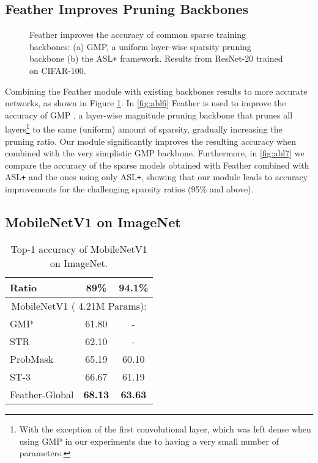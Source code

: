 \documentclass{article}
\begin{document}
\subsection{Feather Improves Pruning Backbones}


\begin{figure}[H]
\begin{center}
\caption{ Feather improves the accuracy of common sparse training backbones: (a) GMP, a uniform layer-wise sparsity pruning backbone (b) the ASL\texttt{+} framework. Results from ResNet-20 trained on CIFAR-100.}
\label{fig:abl67}
\end{center}
\end{figure}

Combining the Feather module with existing backbones results to more accurate networks, as shown in Figure \ref{fig:abl67}. In \ref{fig:abl6} Feather is used to improve the accuracy of GMP \cite{zhu2017prune}, a layer-wise magnitude pruning backbone that prunes all layers\footnote{With the exception of the first convolutional layer, which was left dense when using GMP in our experiments due to having a very small number of parameters.}
to the same (uniform) amount of sparsity, gradually increasing the pruning ratio. Our module significantly improves the resulting accuracy when combined with the very simplistic GMP backbone. Furthermore, in \ref{fig:abl7} we compare the accuracy of the sparse models obtained with Feather combined with ASL\texttt{+} \cite{retsinas2021online} and the ones using only ASL\texttt{+}, showing that our module leads to accuracy improvements for the challenging sparsity ratios (95\% and above).


\subsection{MobileNetV1 on ImageNet}

\begin{table}[H]
\begin{center}
\begin{tabular}{lcc}
\toprule
Ratio & 89\% & 94.1\%   \\
\midrule\midrule
\multicolumn{3}{c}{MobileNetV1 ( 4.21M Params): }  \\ \midrule
GMP \cite{zhu2017prune}       		 	 & 61.80  &   -			\\
STR \cite{kusupati2020soft}     		 & 62.10  &   - 		\\ 
ProbMask \cite{zhou2021effective} 		 & 65.19  & 60.10    	\\
ST-3 \cite{vanderschueren2023straight}   & 66.67  &  61.19  	\\
\hdashline
Feather-Global      					& \textbf{68.13} & \textbf{63.63}  \\
\bottomrule
\end{tabular}
\end{center}
\vspace{10pt}
\caption{Top-1 accuracy of MobileNetV1 on ImageNet.}
\label{tab:mobnet_imagenet_results}
\end{table}
\end{document}
